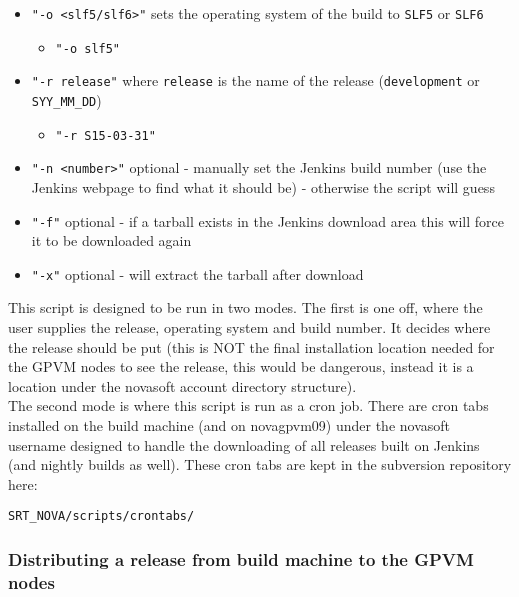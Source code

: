 \documentclass[letterpaper,10pt]{article}
\begin{document}
\begin{itemize}
\item \verb|"-o <slf5/slf6>"| sets the operating system of the build to \verb|SLF5| or \verb|SLF6| 
\begin{itemize}
  \item \verb|"-o slf5"|
  \end{itemize}

\item \verb|"-r release"| where \verb|release| is the name of the release (\verb|development| or \verb|SYY_MM_DD|)
\begin{itemize}
  \item \verb|"-r S15-03-31"|
  \end{itemize}

\item \verb|"-n <number>"| optional - manually set the Jenkins build number (use the Jenkins webpage to find what it should be) - otherwise the script will guess
 
\item \verb|"-f"| optional - if a tarball exists in the Jenkins download area this will force it to be downloaded again

\item \verb|"-x"| optional - will extract the tarball after download
\end{itemize}


This script is designed to be run in two modes. The first is one off, where the user supplies the release, operating system and build number. It decides where the release should be put (this is NOT the final installation location needed for the GPVM nodes to see the release, this would be dangerous, instead it is a location under the novasoft account directory structure).\\

The second mode is where this script is run as a cron job. There are cron tabs installed on the build machine (and on novagpvm09) under the novasoft username designed to handle the downloading of all releases built on Jenkins (and nightly builds as well). These cron tabs are kept in the subversion repository here:

\begin{verbatim}
SRT_NOVA/scripts/crontabs/
\end{verbatim}

\subsubsection{Distributing a release from build machine to the GPVM nodes}
\end{document}
